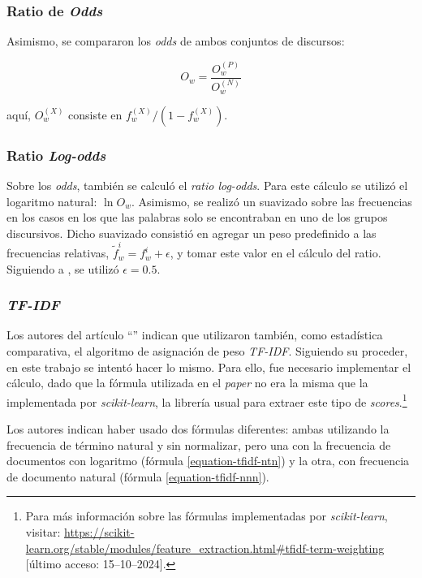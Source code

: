 \subsubsection{Ratio de \textit{Odds}}
Asimismo, se compararon los \textit{odds} de ambos conjuntos de discursos:

\begin{equation}
    O_w = \frac{O_{w}^{(P)}}{O_{w}^{(N)}}
\end{equation}

aqu\'i, $O_{w}^{(X)}$ consiste en $f_{w}^{(X)}/(1-f_{w}^{(X)})$.

\subsubsection{Ratio \textit{Log-odds}}
Sobre los \textit{odds}, tambi\'en se calcul\'o el \textit{ratio log-odds}.
Para este c\'alculo se utiliz\'o el logaritmo natural: $\ln{O_w}$.
Asimismo, se realiz\'o un suavizado sobre las frecuencias en los casos
en los que las palabras solo se encontraban en uno de los grupos
discursivos. Dicho suavizado consisti\'o en agregar un peso predefinido a las
frecuencias relativas, $\tilde{f}^{i}_{w} = f^{i}_{w}+\epsilon$, y tomar
este valor en el c\'alculo del ratio. Siguiendo a \cite{monroe2008fightin},
se utiliz\'o $\epsilon=0.5$.

\subsubsection{\textit{TF-IDF}}
\label{subsubsec-methods-tfidf}
Los autores del art\'iculo ``'' indican
que utilizaron tambi\'en, como estad\'istica comparativa, el algoritmo de asignaci\'on
de peso \textit{TF-IDF}. Siguiendo su proceder, en este trabajo se intent\'o
hacer lo mismo. Para ello, fue necesario implementar el c\'alculo, dado que
la f\'ormula utilizada en el \textit{paper} no era la misma que la implementada
por \textit{scikit-learn}, la librer\'ia usual para extraer
este tipo de \textit{scores}.\footnote{Para m\'as informaci\'on sobre las f\'ormulas
implementadas por \textit{scikit-learn}, visitar:
\url{https://scikit-learn.org/stable/modules/feature_extraction.html\#tfidf-term-weighting} [\'ultimo acceso: 15--10--2024].}\par
Los autores indican haber usado dos f\'ormulas diferentes: ambas utilizando la frecuencia
de t\'ermino natural y sin normalizar, pero una con la frecuencia de documentos
con logaritmo (f\'ormula \ref{equation-tfidf-ntn}) y la otra, con frecuencia de documento
natural (f\'ormula \ref{equation-tfidf-nnn}).

